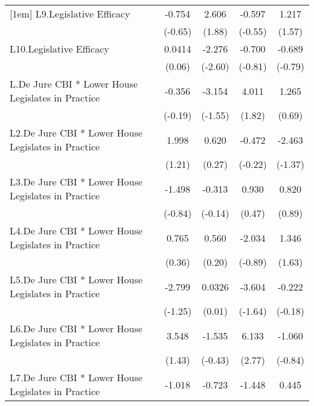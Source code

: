 {\begin{longtable}{l*{4}{c}}
[1em]
L9.Legislative Efficacy&   -0.754         &    2.606         &   -0.597         &    1.217         \\
                &  (-0.65)         &   (1.88)         &  (-0.55)         &   (1.57)         \\
[1em]
L10.Legislative Efficacy&   0.0414         &   -2.276\sym{**} &   -0.700         &   -0.689         \\
                &   (0.06)         &  (-2.60)         &  (-0.81)         &  (-0.79)         \\
[1em]
L.De Jure CBI * Lower House Legislates in Practice&   -0.356         &   -3.154         &    4.011         &    1.265         \\
                &  (-0.19)         &  (-1.55)         &   (1.82)         &   (0.69)         \\
[1em]
L2.De Jure CBI * Lower House Legislates in Practice&    1.998         &    0.620         &   -0.472         &   -2.463         \\
                &   (1.21)         &   (0.27)         &  (-0.22)         &  (-1.37)         \\
[1em]
L3.De Jure CBI * Lower House Legislates in Practice&   -1.498         &   -0.313         &    0.930         &    0.820         \\
                &  (-0.84)         &  (-0.14)         &   (0.47)         &   (0.89)         \\
[1em]
L4.De Jure CBI * Lower House Legislates in Practice&    0.765         &    0.560         &   -2.034         &    1.346         \\
                &   (0.36)         &   (0.20)         &  (-0.89)         &   (1.63)         \\
[1em]
L5.De Jure CBI * Lower House Legislates in Practice&   -2.799         &   0.0326         &   -3.604         &   -0.222         \\
                &  (-1.25)         &   (0.01)         &  (-1.64)         &  (-0.18)         \\
[1em]
L6.De Jure CBI * Lower House Legislates in Practice&    3.548         &   -1.535         &    6.133\sym{**} &   -1.060         \\
                &   (1.43)         &  (-0.43)         &   (2.77)         &  (-0.84)         \\
[1em]
L7.De Jure CBI * Lower House Legislates in Practice&   -1.018         &   -0.723         &   -1.448         &    0.445         \\

\end{longtable}}
